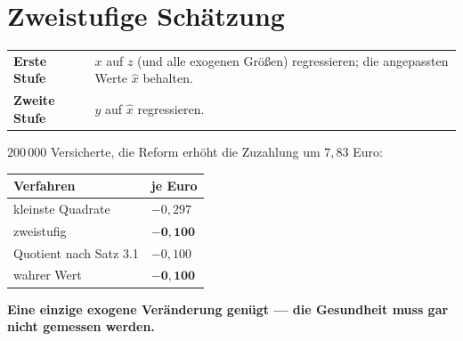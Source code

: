 \section{Zweistufige Schätzung}

\begin{merksatz}
\begin{center}
{\small
\renewcommand{\arraystretch}{1.55}
\begin{tabular}{@{}P{2.4cm}P{6.2cm}@{}}
\toprule
\textbf{Erste Stufe} & $x$ auf $z$ (und alle exogenen Größen) regressieren; die angepassten Werte $\hat x$ behalten.\\
\textbf{Zweite Stufe} & $y$ auf $\hat x$ regressieren.\\
\bottomrule
\end{tabular}}
\end{center}

\begin{center}
\begin{minipage}{0.88\textwidth}
\end{minipage}
\end{center}

$200\,000$ Versicherte, die Reform erhöht die Zuzahlung um $7{,}83$ Euro:

\begin{center}
{\small
\renewcommand{\arraystretch}{1.5}
\begin{tabular}{@{}P{3.4cm}P{2.4cm}@{}}
\toprule
\textbf{Verfahren} & \textbf{je Euro}\\
\midrule
kleinste Quadrate & $-0{,}297$\\
zweistufig & $\mathbf{-0{,}100}$\\
Quotient nach Satz 3.1 & $-0{,}100$\\
\midrule
wahrer Wert & $\mathbf{-0{,}100}$\\
\bottomrule
\end{tabular}}
\end{center}

\begin{center}
\begin{minipage}{0.9\textwidth}
\textbf{Eine einzige exogene Veränderung genügt --- die Gesundheit muss gar nicht gemessen werden.}
\end{minipage}
\end{center}


\end{merksatz}
